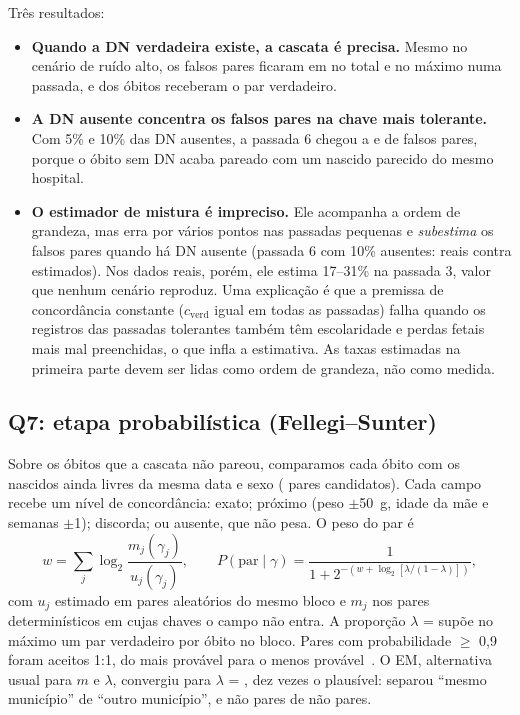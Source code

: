 \documentclass[12pt]{article}
\begin{document}
Três resultados:
\begin{itemize}
  \item \textbf{Quando a DN verdadeira existe, a cascata é precisa.} Mesmo no cenário de ruído alto, os falsos pares ficaram em \vSimAltoFalsos{} no total e no máximo \vSimAltoMaxTol{} numa passada, e \vSimAltoCob{} dos óbitos receberam o par verdadeiro.
  \item \textbf{A DN ausente concentra os falsos pares na chave mais tolerante.} Com 5\% e 10\% das DN ausentes, a passada 6 chegou a \vSimSemCincoSeis{} e \vSimSemDezSeis{} de falsos pares, porque o óbito sem DN acaba pareado com um nascido parecido do mesmo hospital.
  \item \textbf{O estimador de mistura é impreciso.} Ele acompanha a ordem de grandeza, mas erra por vários pontos nas passadas pequenas e \emph{subestima} os falsos pares quando há DN ausente (passada 6 com 10\% ausentes: \vSimSemDezSeis{} reais contra \vSimSemDezSeisEst{} estimados). Nos dados reais, porém, ele estima 17--31\% na passada 3, valor que nenhum cenário reproduz. Uma explicação é que a premissa de concordância constante ($c_{\text{verd}}$ igual em todas as passadas) falha quando os registros das passadas tolerantes também têm escolaridade e perdas fetais mais mal preenchidas, o que infla a estimativa. As taxas estimadas na primeira parte devem ser lidas como ordem de grandeza, não como medida.
\end{itemize}

\subsection{Q7: etapa probabilística (Fellegi--Sunter)}

Sobre os \vFsRestantes{} óbitos que a cascata não pareou, comparamos cada óbito com os nascidos ainda livres da mesma data e sexo (\vFsCand{} pares candidatos). Cada campo recebe um nível de concordância: exato; próximo (peso $\pm$50~g, idade da mãe e semanas $\pm$1); discorda; ou ausente, que não pesa. O peso do par é
\begin{equation}
w = \sum_j \log_2 \frac{m_j(\gamma_j)}{u_j(\gamma_j)}, \qquad
P(\text{par}\mid\gamma) = \frac{1}{1 + 2^{-(w + \log_2[\lambda/(1-\lambda)])}},
\end{equation}
com $u_j$ estimado em pares aleatórios do mesmo bloco e $m_j$ nos pares determinísticos em cujas chaves o campo não entra. A proporção $\lambda$ = \vFsLambda{} supõe no máximo um par verdadeiro por óbito no bloco. Pares com probabilidade $\geq$ 0,9 foram aceitos 1:1, do mais provável para o menos provável~\cite{fellegi1969}. O EM, alternativa usual para $m$ e $\lambda$, convergiu para $\lambda$ = \vFsEmLambda{}, dez vezes o plausível: separou ``mesmo município'' de ``outro município'', e não pares de não pares.
\end{document}
